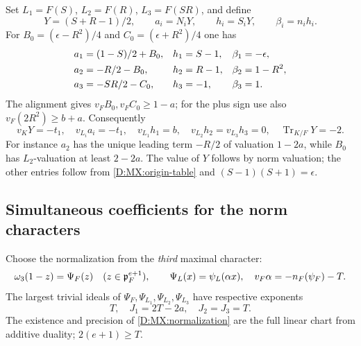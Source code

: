 \documentclass[11pt]{amsart}
\theoremstyle{definition}
\theoremstyle{remark}
\newcommand{\Tr}{\operatorname{Tr}}
\begin{document}
Set $L_1=F(S)$, $L_2=F(R)$, $L_3=F(SR)$, and define
\begin{equation}\label{D:MX:origin}
 Y=(S+R-1)/2,\qquad a_i=N_iY,\qquad h_i=S_iY,\qquad \beta_i=n_i h_i.
\end{equation}
For
$B_0=(\epsilon-R^2)/4$ and $C_0=(\epsilon+R^2)/4$ one has
\begin{align}\label{D:MX:origin-table}
 a_1&=(1-S)/2+B_0,&h_1&=S-1,&\beta_1&=-\epsilon,\notag\\
 a_2&=-R/2-B_0,&h_2&=R-1,&\beta_2&=1-R^2,\notag\\
 a_3&=-SR/2-C_0,&h_3&=-1,&\beta_3&=1.
\end{align}
The alignment gives $v_FB_0,v_FC_0\ge1-a$; for the plus sign use also
$v_F(2R^2)\ge b+a$. Consequently
\begin{equation}\label{D:MX:valuations}
 v_KY=-t_1,\quad v_{L_i}a_i=-t_1,\quad
 v_{L_1}h_1=b,\quad v_{L_2}h_2=v_{L_3}h_3=0,
 \quad\Tr_{K/F}Y=-2.
\end{equation}
For instance $a_2$ has the unique leading term $-R/2$ of valuation
$1-2a$, while $B_0$ has $L_2$-valuation at least $2-2a$.
The value of $Y$ follows by norm valuation; the other entries follow
from \eqref{D:MX:origin-table} and $(S-1)(S+1)=\epsilon$.

\subsection{Simultaneous coefficients for the norm characters}
Choose the normalization from the \emph{third} maximal character:
\begin{equation}\label{D:MX:normalization}
 \omega_3(1-z)=\Psi_F(z)\quad(z\in\mathfrak p_F^{e+1}),\qquad
 \Psi_L(x)=\psi_L(\alpha x),\quad v_F\alpha=-n_F(\psi_F)-T.
\end{equation}
The largest trivial ideals of $\Psi_F,\Psi_{L_1},\Psi_{L_2},\Psi_{L_3}$
have respective exponents
\begin{equation}\label{D:MX:J}
 T,\quad J_1=2T-2a,\quad J_2=J_3=T.
\end{equation}
The existence and precision of \eqref{D:MX:normalization} are the full linear
chart from additive duality; $2(e+1)\ge T$.
\end{document}
